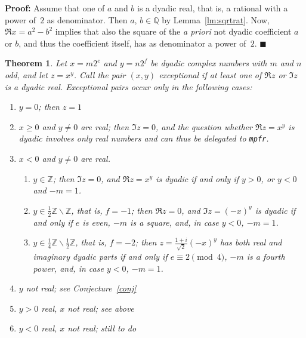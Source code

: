 \documentclass [11pt]{article}
\newcommand {\mpfr}{{\tt mpfr}}
\newcommand {\Z}{\mathbb Z}
\newcommand {\Q}{\mathbb Q}
\renewcommand {\geq}{\geqslant}
\newtheorem{theorem}{Theorem}
\newenvironment{proof}{\noindent \textbf {Proof:}}{{\hspace* {\fill}$\blacksquare$}}
\begin{document}
\begin{proof}
Assume that one of $a$ and $b$ is a dyadic real, that is, a rational with
a power of~$2$ as denominator. Then $a$, $b \in \Q$ by Lemma~\ref {lm:sqrtrat}.
Now, $\Re x = a^2 - b^2$ implies that also the square of the \textit {a priori}
not dyadic coefficient $a$ or $b$, and thus the coefficient itself,
has as denominator a power of~$2$.
\end{proof}


\begin {theorem}
Let $x = m 2^e$ and $y = n 2^f$ be dyadic complex numbers with $m$ and $n$ odd,
and let $z = x^y$. Call the pair $(x, y)$ {\em exceptional} if at least
one of $\Re z$ or $\Im z$ is a dyadic real. Exceptional pairs occur
only in the following cases:
\begin {enumerate}
\item
$y = 0$; then $z = 1$
\item
$x \geq 0$ and $y \neq 0$ are real; then $\Im z = 0$, and the question
whether $\Re z = x^y$ is dyadic involves only real numbers and
can thus be delegated to \mpfr.
\item
$x < 0$ and $y \neq 0$ are real.
\begin {enumerate}
\item
$y \in \Z$; then $\Im z = 0$, and $\Re z = x^y$ is dyadic if and only if
$y > 0$, or $y < 0$ and $-m = 1$.
\item
$y \in \frac {1}{2} \Z \backslash \Z$, that is, $f = -1$;
then $\Re z = 0$, and $\Im z = (-x)^y$ is dyadic if and only if
$e$ is even, $-m$ is a square, and, in case $y < 0$, $-m = 1$.
\item
$y \in \frac {1}{4} \Z \backslash \frac {1}{2} \Z$, that is, $f = -2$;
then $z = \frac {1 + i}{\sqrt 2} (-x)^y$ has both real and imaginary
dyadic parts if and only if
$e \equiv 2 \pmod 4$, $-m$ is a fourth power, and, in case $y < 0$, $-m = 1$.
\end {enumerate}
\item
$y$ not real;
see Conjecture~\ref {conj}
\item
$y > 0$ real, $x$ not real;
see above
\item
$y < 0$ real, $x$ not real;
still to do
\end {enumerate}
\end {theorem}
\end{document}

